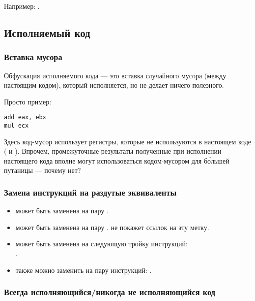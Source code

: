 Например: .

\subsection{Исполняемый код}

\subsubsection{Вставка мусора}

Обфускация исполняемого кода --- это вставка случайного мусора (между настоящим кодом), который исполняется, но не делает
ничего полезного.

Просто пример:

\begin{lstlisting}[caption=оригинальный код,style=customasmx86]
add	eax, ebx
mul	ecx
\end{lstlisting}



Здесь код-мусор использует регистры, которые не используются в настоящем коде ( и ).
Впрочем, промежуточные результаты полученные при исполнении настоящего кода вполне могут использоваться
кодом-мусором для б\'{о}льшей путаницы --- почему нет?

\subsubsection{Замена инструкций на раздутые эквиваленты}

\begin{itemize}
\item {} может быть заменена на пару .
\item {} может быть заменена на пару . 
\IDA{} не покажет ссылок на эту метку.
\item {} может быть заменена на следующую тройку инструкций:\\
.
\item {} также можно заменить на пару инструкций: .
\end{itemize}

\subsubsection{Всегда исполняющийся/никогда не исполняющийся код}

